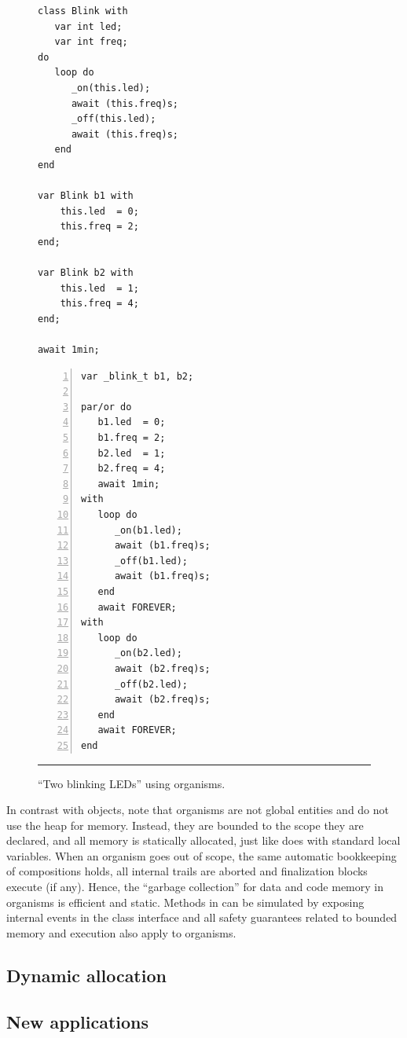 \begin{figure}[t]
\begin{minipage}[t]{0.45\linewidth}
\begin{lstlisting}
class Blink with
   var int led;
   var int freq;
do
   loop do
      _on(this.led);
      await (this.freq)s;
      _off(this.led);
      await (this.freq)s;
   end
end

var Blink b1 with
    this.led  = 0;
    this.freq = 2;
end;

var Blink b2 with
    this.led  = 1;
    this.freq = 4;
end;

await 1min;
\end{lstlisting}
\end{minipage}
%
\begin{minipage}[t]{0.48\linewidth}
\begin{lstlisting}[numbers=left,xleftmargin=1em]
var _blink_t b1, b2;

par/or do
   b1.led  = 0;
   b1.freq = 2;
   b2.led  = 1;
   b2.freq = 4;
   await 1min;
with
   loop do
      _on(b1.led);
      await (b1.freq)s;
      _off(b1.led);
      await (b1.freq)s;
   end
   await FOREVER;
with
   loop do
      _on(b2.led);
      await (b2.freq)s;
      _off(b2.led);
      await (b2.freq)s;
   end
   await FOREVER;
end
\end{lstlisting}
\end{minipage}
\rule{14cm}{0.37pt}
\caption{ ``Two blinking LEDs'' using organisms.
\label{lst.orgs}
}
\end{figure}

In contrast with objects, note that \CEU organisms are not global entities and 
do not use the heap for memory.
Instead, they are bounded to the scope they are declared, and all memory is 
statically allocated, just like \CEU does with standard local variables.
When an organism goes out of scope, the same automatic bookkeeping of 
 compositions holds, all internal trails are aborted and 
finalization blocks execute (if any).
Hence, the ``garbage collection'' for data and code memory in organisms is 
efficient and static.
%
Methods in \CEU can be simulated by exposing internal events in the class 
interface and all safety guarantees related to bounded memory and execution 
also apply to organisms.

\subsection{Dynamic allocation}

\subsection{New applications}

